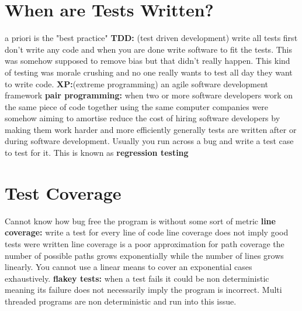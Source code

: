 \documentclass[twoside]{article}
\begin{document}
\section{When are Tests Written?}
a priori is the "best practice"
\newline
\textbf{TDD:} (test driven development) write all tests first don't write any code and when you are done write software to fit the tests. This was somehow supposed to remove bias but that didn't really happen. This kind of testing was morale crushing and no one really wants to test all day they want to write code.
\newline
\textbf{XP:}(extreme programming) an agile software development framework
\newline
\textbf{pair programming:} when two or more software developers work on the same piece of code together using the same computer
\newline
companies were somehow aiming to amortise reduce the cost of hiring software developers by making them work harder and more efficiently 
\newline
generally tests are written after or during software development. Usually you run across a bug and write a test case to test for it. This is known as \textbf{regression testing}

\section{Test Coverage}
Cannot know how bug free the program is without some sort of metric
\newline
\textbf{line coverage:} write a test for every line of code
\newline
line coverage does not imply good tests were written
\newline
line coverage is a poor approximation for path coverage
\newline
the number of possible paths grows exponentially while the number of lines grows linearly. You cannot use a linear means to cover an exponential cases exhaustively. 
\newline
\textbf{flakey tests:} when a test fails it could be non deterministic meaning its failure does not necessarily imply the program is incorrect. Multi threaded programs are non deterministic and run into this issue. 
\end{document}
